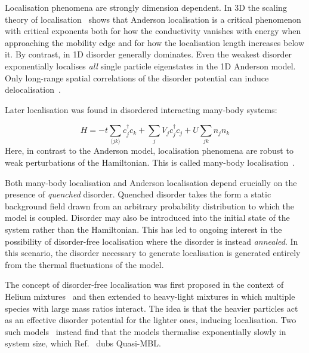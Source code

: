 Localisation phenomena are strongly dimension dependent. In 3D the scaling theory of localisation~\autocite{edwardsNumericalStudiesLocalization1972,kramerLocalizationTheoryExperiment1993} shows that Anderson localisation is a critical phenomenon with critical exponents both for how the conductivity vanishes with energy when approaching the mobility edge and for how the localisation length increases below it. By contrast, in 1D disorder generally dominates. Even the weakest disorder exponentially localises \emph{all} single particle eigenstates in the 1D Anderson model. Only long-range spatial correlations of the disorder potential can induce delocalisation~\autocite{aubryAnalyticityBreakingAnderson1980,dassarmaLocalizationMobilityEdges1990,dunlapAbsenceLocalizationRandomdimer1990,izrailevLocalizationMobilityEdge1999,croyAndersonLocalization1D2011,izrailevAnomalousLocalizationLowDimensional2012}.

Later localisation was found in disordered interacting many-body systems:

\[
H = -t\sum_{\langle jk \rangle} c^\dagger_j c_k + \sum_j V_j c_j^\dagger c_j + U\sum_{jk} n_j n_k
\] Here, in contrast to the Anderson model, localisation phenomena are robust to weak perturbations of the Hamiltonian. This is called many-body localisation~\autocite{imbrieManyBodyLocalizationQuantum2016,gogolinEquilibrationThermalisationEmergence2016}.

Both many-body localisation and Anderson localisation depend crucially on the presence of \emph{quenched} disorder. Quenched disorder takes the form a static background field drawn from an arbitrary probability distribution to which the model is coupled. Disorder may also be introduced into the initial state of the system rather than the Hamiltonian. This has led to ongoing interest in the possibility of disorder-free localisation where the disorder is instead \emph{annealed}. In this scenario, the disorder necessary to generate localisation is generated entirely from the thermal fluctuations of the model.

The concept of disorder-free localisation was first proposed in the context of Helium mixtures~\autocite{kagan1984localization} and then extended to heavy-light mixtures in which multiple species with large mass ratios interact. The idea is that the heavier particles act as an effective disorder potential for the lighter ones, inducing localisation. Two such models~\autocite{yaoQuasiManyBodyLocalizationTranslationInvariant2016,schiulazDynamicsManybodyLocalized2015} instead find that the models thermalise exponentially slowly in system size, which Ref.~\autocite{yaoQuasiManyBodyLocalizationTranslationInvariant2016} dubs Quasi-MBL.

